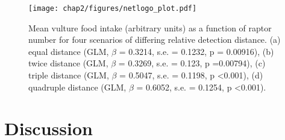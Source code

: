 



\begin{figure}[H] %
	  \centering
	  \texttt{[image: chap2/figures/netlogo\_plot.pdf]}
	    \caption[Results of agent-based model] %
	    {Mean vulture food intake (arbitrary units) as a function of raptor number for four scenarios of differing relative detection distance. (a) equal distance (GLM, $\beta$ = 0.3214, s.e. = 0.1232, p = 0.00916), (b) twice distance (GLM, $\beta$ = 0.3269, s.e. = 0.123, p =0.00794), (c) triple distance (GLM, $\beta$ = 0.5047, s.e. = 0.1198, p <0.001), (d) quadruple distance (GLM, $\beta$ = 0.6052, s.e. = 0.1254, p <0.001). }%
	  \label{fig:netlogo_plot}
	\end{figure}
	

\section{\uppercase{D}iscussion}

